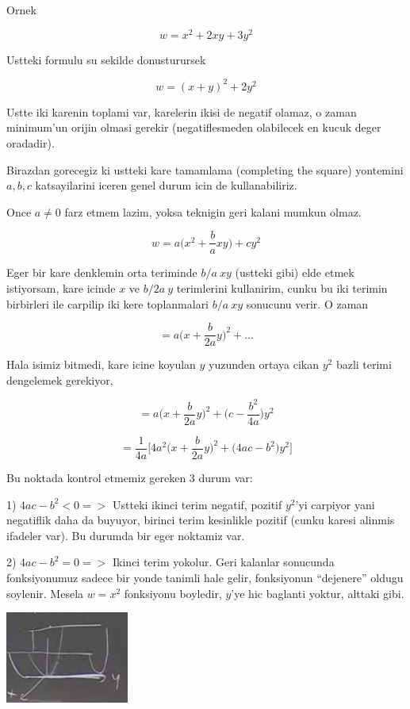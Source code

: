 \documentclass[12pt,fleqn]{article}\usepackage{../common}
\begin{document}
Ornek

\[ w = x^2 + 2xy + 3y^2 \]

Ustteki formulu su sekilde donusturursek

\[ w = (x+y)^2 + 2y^2 \]

Ustte iki karenin toplami var, karelerin ikisi de negatif olamaz, o zaman
minimum'un orijin olmasi gerekir (negatiflesmeden olabilecek en kucuk deger
oradadir). 

Birazdan gorecegiz ki ustteki kare tamamlama (completing the square)
yontemini $a,b,c$ katsayilarini iceren genel durum icin de kullanabiliriz. 

Once $a \ne 0$ farz etmem lazim, yoksa teknigin geri kalani mumkun olmaz. 

\[ w = a \bigg( x^2 + \frac{b}{a} xy \bigg) + cy^2 \]

Eger bir kare denklemin orta teriminde $b/a \ xy$ (ustteki gibi) elde etmek
istiyorsam, kare icinde $x$ ve $b/2a \ y$ terimlerini kullanirim, cunku bu iki
terimin birbirleri ile carpilip iki kere toplanmalari $b/a \ xy$ sonucunu
verir. O zaman

\[ = a \bigg( x + \frac{b}{2a}y  \bigg)^2  + ... \]

Hala isimiz bitmedi, kare icine koyulan $y$ yuzunden ortaya cikan $y^2$ bazli
terimi dengelemek gerekiyor,

\[ = a \bigg( x + \frac{b}{2a}y  \bigg)^2  + 
\bigg( c - \frac{b^2}{4a} \bigg)y^2
 \]


\[ = \frac{1}{4a} 
\bigg[
4a^2 \bigg( x+\frac{b}{2a}y \bigg)^2 +
\bigg(4ac - b^2 \bigg)y^2
\bigg]
\]


Bu noktada kontrol etmemiz gereken 3 durum var:

1) $4ac - b^2 < 0 => $ Ustteki ikinci terim negatif, pozitif $y^2$'yi
carpiyor yani negatiflik daha da buyuyor, birinci terim kesinlikle pozitif
(cunku karesi alinmis ifadeler var). Bu durumda bir eger noktamiz var. 

2)  $4ac - b^2 = 0 => $ Ikinci terim yokolur. Geri kalanlar sonucunda
fonksiyonumuz sadece bir yonde tanimli hale gelir, fonksiyonun ``dejenere''
oldugu soylenir. Mesela $w = x^2$ fonksiyonu boyledir, $y$'ye hic baglanti
yoktur, alttaki gibi.

\includegraphics[height=3cm]{10_2.png}
\end{document}
